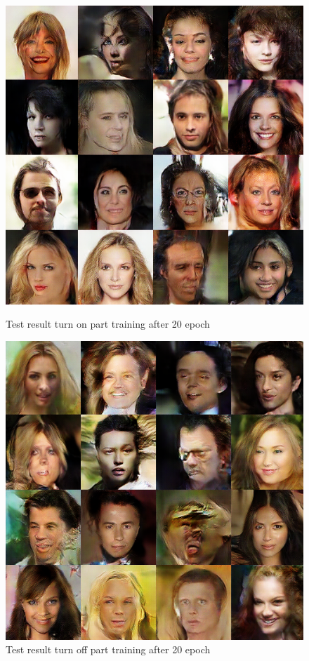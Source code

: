 \begin{figure}
    \begin{minipage}[t]{0.48\linewidth}
        \centering
        \includegraphics[width=\textwidth]{figures/result_part_on.png}
        \caption{Test result turn on part training after 20 epoch}
        \label{part_on}
    \end{minipage}
        \hfill
    \begin{minipage}[t]{0.48\linewidth}
        \centering
        \includegraphics[width=\textwidth]{figures/result_part_off.png}
        \caption{Test result turn off part training after 20 epoch}
        \label{part_off}
    \end{minipage}
\end{figure}


